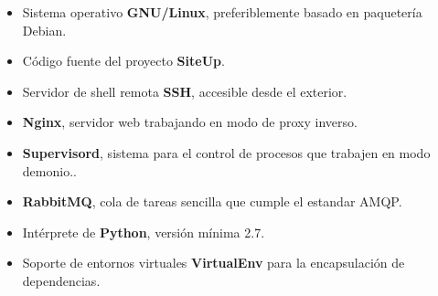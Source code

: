 \begin{itemize}
\item Sistema operativo \textbf{GNU/Linux}, preferiblemente basado en paquetería Debian.
\item Código fuente del proyecto \textbf{SiteUp}.
\item Servidor de shell remota \textbf{SSH}, accesible desde el exterior.
\item \textbf{Nginx}, servidor web trabajando en modo de proxy inverso.
\item \textbf{Supervisord}, sistema para el control de procesos que trabajen en modo demonio..
\item \textbf{RabbitMQ}, cola de tareas sencilla que cumple el estandar \ac{AMQP}.
\item Intérprete de \textbf{Python}, versión mínima 2.7.
\item Soporte de entornos virtuales \textbf{VirtualEnv} para la encapsulación de
  dependencias.
\end{itemize}





